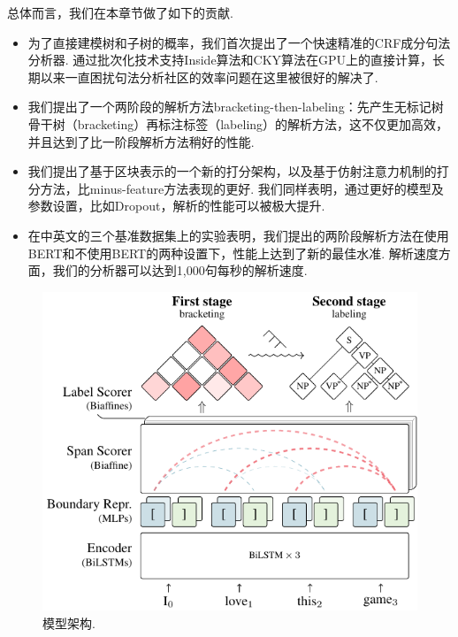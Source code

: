 总体而言，我们在本章节做了如下的贡献.
\begin{itemize}
  \item 为了直接建模树和子树的概率，我们首次提出了一个快速精准的CRF成分句法分析器.
        通过批次化技术支持Inside算法和CKY算法在GPU上的直接计算，长期以来一直困扰句法分析社区的效率问题在这里被很好的解决了.

  \item 我们提出了一个两阶段的解析方法bracketing-then-labeling：先产生无标记树骨干树（bracketing）再标注标签（labeling）的解析方法，这不仅更加高效，并且达到了比一阶段解析方法稍好的性能.

  \item 我们提出了基于区块表示的一个新的打分架构，以及基于仿射注意力机制的打分方法，比minus-feature方法表现的更好.
        我们同样表明，通过更好的模型及参数设置，比如Dropout，解析的性能可以被极大提升.

  \item 在中英文的三个基准数据集上的实验表明，我们提出的两阶段解析方法在使用BERT和不使用BERT\citep{devlin-etal-2019-bert}的两种设置下，性能上达到了新的最佳水准.
        解析速度方面，我们的分析器可以达到1,000句每秒的解析速度.
\end{itemize}

\begin{figure}[tb]
  \centering
  \includegraphics [scale=1.2]{figures/con-framework.pdf}
  \caption{模型架构.}
  \label{fig:con-framework}
\end{figure}

